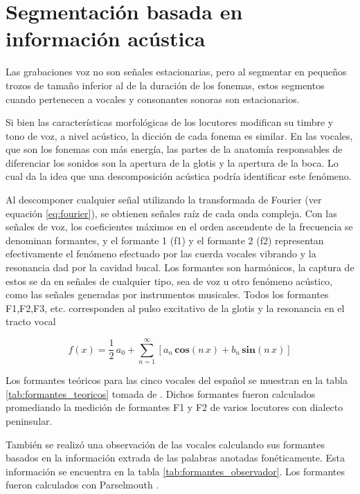 \section{Segmentación basada en información acústica}

Las grabaciones voz no son señales estacionarias, pero al segmentar en pequeños trozos de tamaño inferior al de la duración de los fonemas, estos segmentos cuando pertenecen a vocales y consonantes sonoras son estacionarios.

Si bien las características morfológicas de los locutores modifican su timbre y tono de voz, a nivel acústico, la dicción de cada fonema es similar. En las vocales, que son los fonemas con más energía, las partes de la anatomía responsables de diferenciar los sonidos son la apertura de la glotis y la apertura de la boca. Lo cual da la idea que una descomposición acústica podría identificar este fenómeno.

Al descomponer cualquier señal utilizando la transformada de Fourier (ver equación \ref{eq:fourier}), se obtienen señales raíz de cada onda compleja. Con las señales de voz, los coeficientes máximos  en el orden ascendente de la frecuencia se denominan formantes, y el formante 1 (f1) y el formante 2 (f2) representan efectivamente el fenómeno efectuado por las cuerda vocales vibrando y la resonancia dad por la cavidad bucal. Los formantes son harmónicos, la captura de estos se da en señales de cualquier tipo, sea de voz u otro fenómeno acústico, como las señales generadas por instrumentos musicales. Todos los formantes F1,F2,F3, etc. corresponden al pulso excitativo de la glotis y la resonancia en el tracto vocal

\begin{equation}
\label{eq:fourier}    
f(x) = \frac{1}{2} \, a_{0} + \sum_{n=1}^{\infty} \left[
   a_{n}\,\mathbf{cos} (n\,x) + b_{n} \,\mathbf{sin} (n\,x) \right]
\end{equation}

Los formantes teóricos para las cinco vocales del español se muestran en la tabla \ref{tab:formantes_teoricos} tomada de \cite{Bradlow1995}. Dichos formantes fueron calculados promediando la medición de formantes F1 y F2 de varios locutores con dialecto peninsular.



También se realizó una observación de las vocales calculando sus formantes basados en la información extrada de las palabras anotadas fonéticamente. Esta información se encuentra en la tabla \ref{tab:formantes_observador}. Los formantes fueron calculados con Parselmouth \cite{parselmouth}.

